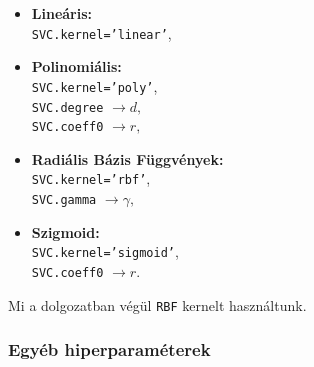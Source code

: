 \begin{itemize}
\item
	\textbf{Lineáris:} \\
	\texttt{SVC.kernel='linear'},
\item
	\textbf{Polinomiális:} \\
	\texttt{SVC.kernel='poly'},	\\
	\texttt{SVC.degree} $ \rightarrow d, $ \\
	\texttt{SVC.coeff0} $ \rightarrow r, $
\item 
	\textbf{Radiális Bázis Függvények:} \\
	\texttt{SVC.kernel='rbf'},	\\
	\texttt{SVC.gamma} $ \rightarrow \gamma, $
\item 
	\textbf{Szigmoid:} \\
	\texttt{SVC.kernel='sigmoid'},	\\
	\texttt{SVC.coeff0} $ \rightarrow r. $
\end{itemize}
%
%
%
%
%
%
%
%
%
%
%
%
%
%
%
%
%


\noindent
Mi a dolgozatban végül \texttt{RBF} kernelt használtunk.

\subsubsection{Egyéb hiperparaméterek}

